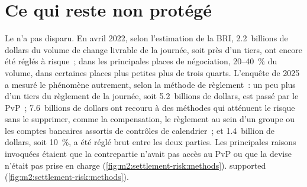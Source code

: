 \section{Ce qui reste non protégé}

Le  n'a pas disparu. En avril 2022, selon l'estimation de la BRI, 2.2~billions de dollars du
volume de change livrable de la journée, soit près d'un tiers, ont encore été réglés à risque~; dans les
principales places de négociation, 20--40~\% du volume, dans certaines places plus petites plus de
trois quarts. L'enquête de 2025 a mesuré le phénomène autrement, selon la méthode de règlement~: un peu plus
d'un tiers du règlement de la journée, soit 5.2~billions de dollars, est passé par le PvP~; 7.6~billions de dollars ont recouru à des
méthodes qui atténuent le risque sans le supprimer, comme la compensation, le règlement au sein d'un groupe ou les comptes bancaires
assortis de contrôles de calendrier~; et 1.4~billion de dollars, soit 10~\%, a été réglé brut entre les deux
parties. Les principales raisons invoquées étaient que la contrepartie n'avait pas accès au PvP ou que la devise
n'était pas prise en charge (\cref{fig:m2:settlement-risk:methods}).
supported (\cref{fig:m2:settlement-risk:methods}).

\begin{omfigure}

\label{fig:m2:settlement-risk:methods}
\end{omfigure}

